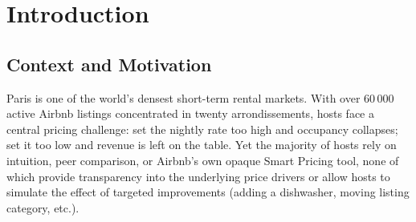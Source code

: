 \documentclass[12pt, a4paper]{article}
\begin{document}
\begin{abstract}
\noindent
This report presents a data-driven analysis of Airbnb listing prices in Paris, drawing on a dataset of 64\,690 active listings sourced from Kaggle (\url{https://www.kaggle.com/datasets/abaghyangor/airbnb-paris}), filtered to 63\,520 after outlier removal. We address the central question: \textit{what are the key drivers of nightly prices, and can we build a reliable predictive model to help hosts set an optimal price?} Our pipeline combines exploratory data analysis, feature engineering (33 raw columns to 78 candidate features, then 37 selected), supervised regression and classification, amenity value analysis, and unsupervised segmentation. Across eight models, a GridSearch-tuned XGBoost pipeline achieves the strongest out-of-sample performance: R\textsuperscript{2}~=~0.657 on the log-price scale, with a back-transformed MAE of \euro{}27.2 on a median listing price of \euro{}80. Accommodation capacity (\texttt{accommodates}, \texttt{bedrooms}), room type, neighbourhood, and amenity count are the dominant price drivers. K-Means clustering (k~=~4) identifies four economically coherent market segments, independently validated by Ward hierarchical clustering (78\% agreement). These findings are translated into five actionable recommendations for Parisian hosts.
\end{abstract}

\tableofcontents
\newpage

\section{Introduction}

\subsection{Context and Motivation}

Paris is one of the world's densest short-term rental markets. With over 60\,000 active Airbnb listings concentrated in twenty arrondissements, hosts face a central pricing challenge: set the nightly rate too high and occupancy collapses; set it too low and revenue is left on the table. Yet the majority of hosts rely on intuition, peer comparison, or Airbnb's own opaque Smart Pricing tool, none of which provide transparency into the underlying price drivers or allow hosts to simulate the effect of targeted improvements (adding a dishwasher, moving listing category, etc.).
\end{document}
